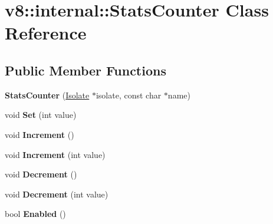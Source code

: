 \hypertarget{classv8_1_1internal_1_1_stats_counter}{}\section{v8\+:\+:internal\+:\+:Stats\+Counter Class Reference}
\label{classv8_1_1internal_1_1_stats_counter}
\subsection*{Public Member Functions}
\begin{DoxyCompactItemize}
\item 
{\bfseries Stats\+Counter} (\hyperlink{classv8_1_1internal_1_1_isolate}{Isolate} $\ast$isolate, const char $\ast$name)\hypertarget{classv8_1_1internal_1_1_stats_counter_a32d87e78114fcc53ad1270af9a74c5f5}{}\label{classv8_1_1internal_1_1_stats_counter_a32d87e78114fcc53ad1270af9a74c5f5}

\item 
void {\bfseries Set} (int value)\hypertarget{classv8_1_1internal_1_1_stats_counter_aab7d2cc46f664c55ce42c0e76ac1948e}{}\label{classv8_1_1internal_1_1_stats_counter_aab7d2cc46f664c55ce42c0e76ac1948e}

\item 
void {\bfseries Increment} ()\hypertarget{classv8_1_1internal_1_1_stats_counter_a4cdc5bd23db581434e00b11dac816da4}{}\label{classv8_1_1internal_1_1_stats_counter_a4cdc5bd23db581434e00b11dac816da4}

\item 
void {\bfseries Increment} (int value)\hypertarget{classv8_1_1internal_1_1_stats_counter_ae4c0e7e6f3e5a9ca15a8a9a17fc39fb2}{}\label{classv8_1_1internal_1_1_stats_counter_ae4c0e7e6f3e5a9ca15a8a9a17fc39fb2}

\item 
void {\bfseries Decrement} ()\hypertarget{classv8_1_1internal_1_1_stats_counter_aa077f958b0c5d985b577b92b9c7f39fa}{}\label{classv8_1_1internal_1_1_stats_counter_aa077f958b0c5d985b577b92b9c7f39fa}

\item 
void {\bfseries Decrement} (int value)\hypertarget{classv8_1_1internal_1_1_stats_counter_ad4ec0707eb464394d638340ee2f22996}{}\label{classv8_1_1internal_1_1_stats_counter_ad4ec0707eb464394d638340ee2f22996}

\item 
bool {\bfseries Enabled} ()\hypertarget{classv8_1_1internal_1_1_stats_counter_abcc22126787bbe92b4dd31979124cf84}{}\label{classv8_1_1internal_1_1_stats_counter_abcc22126787bbe92b4dd31979124cf84}


\end{DoxyCompactItemize}

